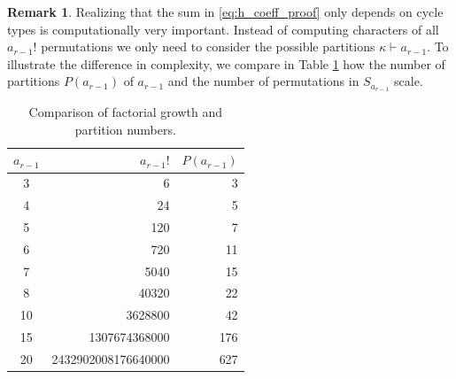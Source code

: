 \documentclass{article}
\theoremstyle{definition}
\newtheorem{remark}[theorem]{Remark}
\begin{document}
\begin{remark}
Realizing that the sum in \eqref{eq:h_coeff_proof} only depends on cycle types is computationally very important. Instead of computing characters of all $a_{r-1}!$ permutations we only need to consider the possible partitions $\kappa \vdash a_{r-1}$. To illustrate the difference in complexity, we compare in Table \ref{tab:comparison} how the number of partitions $P(a_{r-1})$ of $a_{r-1}$ and the number of permutations in $S_{a_{r-1}}$ scale. 
\begin{table}[H]
\begin{center}
\begin{tabular}{|c r r|} 
\hline
 $a_{r-1}$ & $a_{r-1}!$ & $P(a_{r-1})$ \\ [0.5ex] 
 \hline
 3  & 6 & 3 \\ 
 4  & 24 & 5 \\
 5  & 120 & 7 \\
 6  & 720 & 11 \\
 7  & 5040 & 15 \\
 8  & 40320 & 22 \\
 10 & 3628800 & 42 \\
 15 & 1307674368000 & 176 \\
 20 & 2432902008176640000 & 627 \\ [1ex] 
 \hline
\end{tabular}
\caption{Comparison of factorial growth and partition numbers.}
\label{tab:comparison}
\end{center}
\end{table}
\end{remark}
\end{document}
